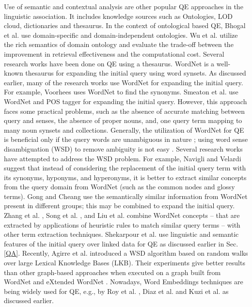 Use of semantic and contextual analysis are other popular QE approaches in the linguistic association. It includes knowledge sources such as Ontologies, LOD cloud, dictionaries and thesaurus. In the context of ontological based QE, Bhogal et al. \cite{bhogal2007review} use domain-specific and domain-independent ontologies. Wu et al. \cite{wu2011study} utilize the rich semantics of domain ontology and evaluate the trade-off  between the improvement in retrieval effectiveness and the  computational cost. Several research works have been done on QE using a thesaurus. WordNet is a well-known thesaurus for expanding the initial query using word synsets. As discussed earlier, many of the research works use WordNet for expanding the initial query. For example, Voorhees \cite{voorhees1994query} uses WordNet to find the synonyms. Smeaton et al. \cite{smeaton1995trec} use WordNet and POS tagger for expanding the initial query. However, this approach faces some practical problems, such as the absence of accurate matching between query and senses, the absence of proper nouns, and, one query term mapping to many noun synsets and collections. Generally, the utilization of WordNet for QE is beneficial only if the query words are unambiguous in nature \cite{gonzalo1998indexing,voorhees1994query}; using word sense disambiguation (WSD) to remove ambiguity is not easy \cite{navigli2009word,pal2015word}. Several research works have attempted to address the WSD problem. For example, Navigli and Velardi \cite{navigli2005structural} suggest that instead of considering the replacement of the initial query term with its synonyms, hyponyms, and hyperonyms, it is better to extract  similar concepts from the query domain from  WordNet (such as the common nodes and glossy terms). Gong and Cheang \cite{gong2006multi} use the semantically similar information from WordNet present in different groups; this may be combined to expand the initial query. Zhang et al.  \cite{zhang2009concept}, Song et al. \cite{song2007integration}, and Liu et al. \cite{liu2004effective} combine WordNet concepts -- that are extracted by applications of heuristic rules to match similar query terms -- with other term extraction techniques. Shekarpour et al. \cite{shekarpour2013keyword} use linguistic and semantic features of the initial query over linked data for QE as discussed earlier in Sec. \ref{QA}. Recently, Agirre et al. \cite{agirre2014random} introduced a WSD algorithm based on random walks over large Lexical Knowledge Bases (LKB). Their experiments give better results than other graph-based approaches when executed on a graph built from WordNet and eXtended WordNet \cite{mihalcea2001extended}. Nowadays, Word Embeddings techniques are being widely used for QE, e.g., by Roy et al. \cite{roy2016using}, Diaz et al. \cite{diaz2016query} and Kuzi et al. \cite{kuzi2016query} as discussed earlier. 

